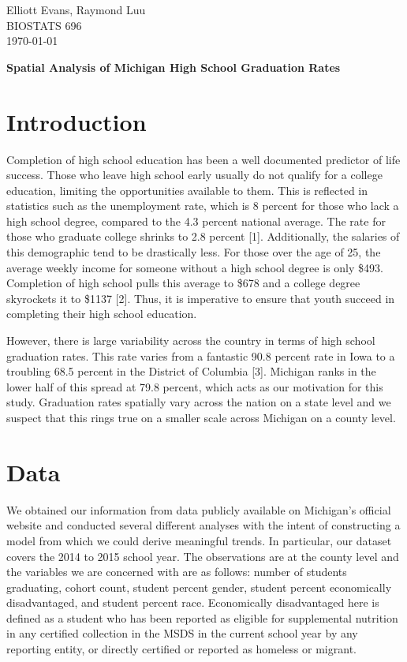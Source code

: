 \documentclass[12pt,letterpaper]{article}
\begin{document}
\begin{flushright}
Elliott Evans, Raymond Luu\\ BIOSTATS 696\\ \today
\end{flushright}

\begin{center}
\LARGE\textbf{Spatial Analysis of Michigan High School Graduation Rates}
\end{center}

\section{Introduction}

Completion of high school education has been a well documented predictor of life success. Those who leave high school early usually do not qualify for a college education,  limiting the opportunities available to them. This is reflected in statistics such as the unemployment rate, which is 8 percent for those who lack a high school degree, compared to the 4.3 percent national average. The rate for those who graduate college shrinks to 2.8 percent [1]. Additionally, the salaries of this demographic tend to be drastically less. For those over the age of 25, the average weekly income for someone without a high school degree is only \$493. Completion of high school pulls this average to \$678 and a college degree skyrockets it to \$1137 [2]. Thus, it is imperative to ensure that youth succeed in completing their high school education. 

However, there is large variability across the country in terms of high school graduation rates. This rate varies from a fantastic 90.8 percent rate in Iowa to a troubling 68.5 percent in the District of Columbia [3]. Michigan ranks in the lower half of this spread at 79.8 percent, which acts as our motivation for this study. Graduation rates spatially vary across the nation on a state level and we suspect that this rings true on a smaller scale across Michigan on a county level. 


\section{Data}

We obtained our information from data publicly available on Michigan's official website and conducted several different analyses with the intent of constructing a model from which we could derive meaningful trends. In particular, our dataset covers the 2014 to 2015 school year. The observations are at the county level and the variables we are concerned with are as follows: number of students graduating, cohort count, student percent gender, student percent economically disadvantaged, and student percent race. Economically disadvantaged here is defined as a student who has been reported as eligible for supplemental nutrition in any certified collection in the MSDS in the current school year by any reporting entity, or directly certified or reported as homeless or migrant. 
\end{document}
